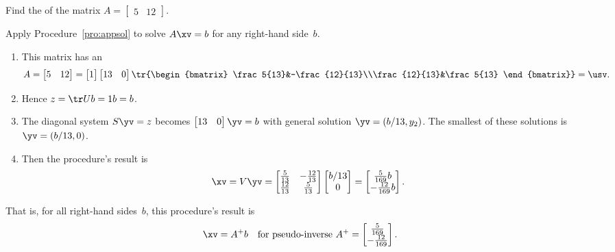 \begin{example} \label{eg:}
Find the  of the matrix \(A=\begin{bmatrix} 5&12 \end{bmatrix}\).
\begin{solution} 
Apply Procedure~\ref{pro:appsol} to solve \(A\xv=b\) for any right-hand side~\(b\).
\begin{enumerate}
\item This matrix has an \svd\ 
\begin{equation*}
A=\begin{bmatrix} 5&12 \end{bmatrix}
=\begin{bmatrix} 1 \end{bmatrix}
\begin{bmatrix} 13& 0 \end{bmatrix}
\tr{\begin{bmatrix} \frac5{13}&-\frac{12}{13}\\\frac{12}{13}&\frac5{13} \end{bmatrix}}
=\usv.
\end{equation*}

\item Hence \(z=\tr Ub=1b=b\).
\item The diagonal system \(S\yv=z\) becomes \(\begin{bmatrix} 13&0 \end{bmatrix}\yv=b\) with general solution \(\yv=(b/13,y_2)\).
The smallest of these solutions is \(\yv=(b/13,0)\).
\item Then the procedure's result is 
\begin{equation*}
\xv=V\yv=\begin{bmatrix} \frac5{13}&-\frac{12}{13}\\\frac{12}{13}&\frac5{13} \end{bmatrix}\begin{bmatrix} b/13\\0 \end{bmatrix}
=\begin{bmatrix} \frac5{169}b\\-\frac{12}{169}b \end{bmatrix}.
\end{equation*}

\end{enumerate}
That is, for all right-hand sides~\(b\), this procedure's result is
\begin{equation*}
\xv=A^+b\quad\text{for pseudo-inverse }A^+=\begin{bmatrix} \frac5{169}\\-\frac{12}{169} \end{bmatrix}.
\end{equation*}
\end{solution}
\end{example}





